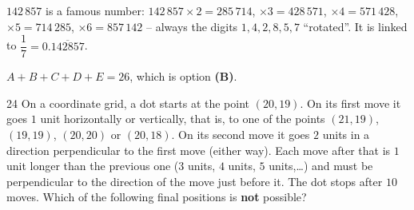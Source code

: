 {\begin{tipbox}$142\,857$ is a famous number: $142\,857\times 2=285\,714$, $\times 3=428\,571$, $\times 4=571\,428$, $\times 5=714\,285$, $\times 6=857\,142$ -- always the digits $1,4,2,8,5,7$ ``rotated''. It is linked to $\dfrac17=0.\overline{142857}$.\end{tipbox}

$A+B+C+D+E=26$, which is option \textbf{(B)}.
}

\begin{probbox}{24}{\relax}
On a coordinate grid, a dot starts at the point $(20,19)$. On its first move it goes $1$ unit horizontally or vertically, that is, to one of the points $(21,19)$, $(19,19)$, $(20,20)$ or $(20,18)$. On its second move it goes $2$ units in a direction perpendicular to the first move (either way). Each move after that is $1$ unit longer than the previous one ($3$ units, $4$ units, $5$ units,\dots) and must be perpendicular to the direction of the move just before it. The dot stops after $10$ moves. Which of the following final positions is \textbf{not} possible?
\end{probbox}
